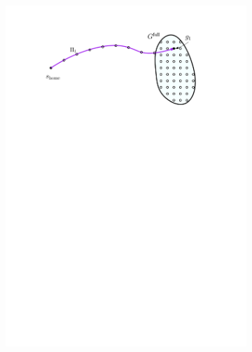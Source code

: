 \documentclass[conference]{IEEEtran}
\begin{document}
\begin{figure}[t]
    \centering
    \begin{subfigure}{.3\textwidth}
        \includegraphics[width=\textwidth]{2_compute_root_paths_1}
        \caption{}
        \label{fig:crp1}
    \end{subfigure}
    \hspace{2mm}
    \begin{subfigure}{0.3\textwidth}

\end{subfigure}
\end{figure}
\end{document}
